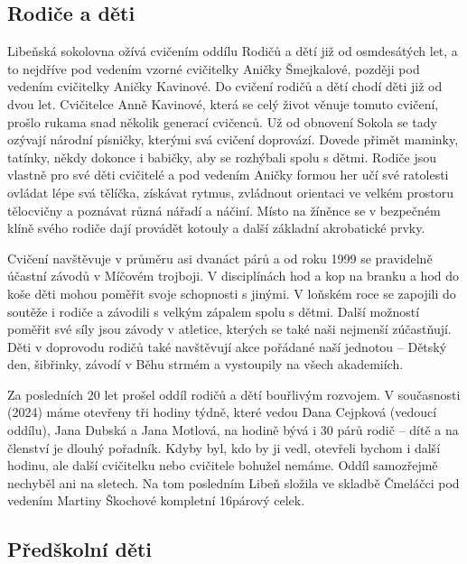 \subsection{\texorpdfstring{Rodiče a děti
}{Rodiče a děti }}\label{rodiux10de-a-dux11bti}

Libeňská sokolovna ožívá cvičením oddílu Rodičů a dětí již od
osmdesátých let, a to nejdříve pod vedením vzorné cvičitelky Aničky
Šmejkalové, později pod vedením cvičitelky Aničky Kavinové. Do cvičení
rodičů a dětí chodí děti již od dvou let. Cvičitelce Anně Kavinové,
která se celý život věnuje tomuto cvičení, prošlo rukama snad několik
generací cvičenců. Už od obnovení Sokola se tady ozývají národní
písničky, kterými svá cvičení doprovází. Dovede přimět maminky, tatínky,
někdy dokonce i babičky, aby se rozhýbali spolu s dětmi. Rodiče jsou
vlastně pro své děti cvičitelé a pod vedením Aničky formou her učí své
ratolesti ovládat lépe svá tělíčka, získávat rytmus, zvládnout orientaci
ve velkém prostoru tělocvičny a poznávat různá nářadí a náčiní. Místo na
žíněnce se v bezpečném klíně svého rodiče dají provádět kotouly a další
základní akrobatické prvky.

Cvičení navštěvuje v průměru asi dvanáct párů a od roku 1999 se
pravidelně účastní závodů v Míčovém trojboji. V disciplínách hod a kop
na branku a hod do koše děti mohou poměřit svoje schopnosti s jinými. V
loňském roce se zapojili do soutěže i rodiče a závodili s velkým zápalem
spolu s dětmi. Další možností poměřit své síly jsou závody v atletice,
kterých se také naši nejmenší zúčastňují. Děti v doprovodu rodičů také
navštěvují akce pořádané naší jednotou -- Dětský den, šibřinky, závodí v
Běhu strmém a vystoupily na všech akademiích.

Za posledních 20 let prošel oddíl rodičů a dětí bouřlivým rozvojem. V
současnosti (2024) máme otevřeny tři hodiny týdně, které vedou Dana
Cejpková (vedoucí oddílu), Jana Dubská a Jana Motlová, na hodině bývá i
30 párů rodič -- dítě a na členství je dlouhý pořadník. Kdyby byl, kdo
by ji vedl, otevřeli bychom i další hodinu, ale další cvičitelku nebo
cvičitele bohužel nemáme. Oddíl samozřejmě nechyběl ani na sletech. Na
tom posledním Libeň složila ve skladbě Čmeláčci pod vedením Martiny
Škochové kompletní 16párový celek.

\subsection{Předškolní děti}\label{pux159edux161kolnuxed-dux11bti}

